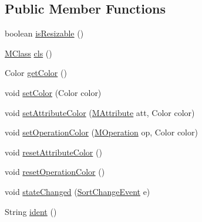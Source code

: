 \subsection*{Public Member Functions}
\begin{DoxyCompactItemize}
\item 
boolean \hyperlink{classorg_1_1tzi_1_1use_1_1gui_1_1views_1_1diagrams_1_1classdiagram_1_1_class_node_a48d618182bfb8071156f70d9b7b634ae}{is\-Resizable} ()
\item 
\hyperlink{interfaceorg_1_1tzi_1_1use_1_1uml_1_1mm_1_1_m_class}{M\-Class} \hyperlink{classorg_1_1tzi_1_1use_1_1gui_1_1views_1_1diagrams_1_1classdiagram_1_1_class_node_acce7dd61645567fa4b16e7d68d299ce1}{cls} ()
\item 
Color \hyperlink{classorg_1_1tzi_1_1use_1_1gui_1_1views_1_1diagrams_1_1classdiagram_1_1_class_node_af8bcb8c19fb96391258b9189fad09f78}{get\-Color} ()
\item 
void \hyperlink{classorg_1_1tzi_1_1use_1_1gui_1_1views_1_1diagrams_1_1classdiagram_1_1_class_node_a3b56831511cac09d67dbd0e637dbc1a2}{set\-Color} (Color color)
\item 
void \hyperlink{classorg_1_1tzi_1_1use_1_1gui_1_1views_1_1diagrams_1_1classdiagram_1_1_class_node_a0f73330132d65998e9b30d01a4bec8e7}{set\-Attribute\-Color} (\hyperlink{classorg_1_1tzi_1_1use_1_1uml_1_1mm_1_1_m_attribute}{M\-Attribute} att, Color color)
\item 
void \hyperlink{classorg_1_1tzi_1_1use_1_1gui_1_1views_1_1diagrams_1_1classdiagram_1_1_class_node_a89e6af0ba45804e9c2c76060544d2b72}{set\-Operation\-Color} (\hyperlink{classorg_1_1tzi_1_1use_1_1uml_1_1mm_1_1_m_operation}{M\-Operation} op, Color color)
\item 
void \hyperlink{classorg_1_1tzi_1_1use_1_1gui_1_1views_1_1diagrams_1_1classdiagram_1_1_class_node_a420bb41486e9433efe0f9c9e1d97fcf1}{reset\-Attribute\-Color} ()
\item 
void \hyperlink{classorg_1_1tzi_1_1use_1_1gui_1_1views_1_1diagrams_1_1classdiagram_1_1_class_node_a19a341c2c2d0a8b941ac731ed638423c}{reset\-Operation\-Color} ()
\item 
void \hyperlink{classorg_1_1tzi_1_1use_1_1gui_1_1views_1_1diagrams_1_1classdiagram_1_1_class_node_a5d8dba71500fc69928a56574f84842ac}{state\-Changed} (\hyperlink{classorg_1_1tzi_1_1use_1_1gui_1_1main_1_1_model_browser_sorting_1_1_sort_change_event}{Sort\-Change\-Event} e)
\item 
String \hyperlink{classorg_1_1tzi_1_1use_1_1gui_1_1views_1_1diagrams_1_1classdiagram_1_1_class_node_a6610a4c357de6f091ee628c2484ac67d}{ident} ()

\end{DoxyCompactItemize}
